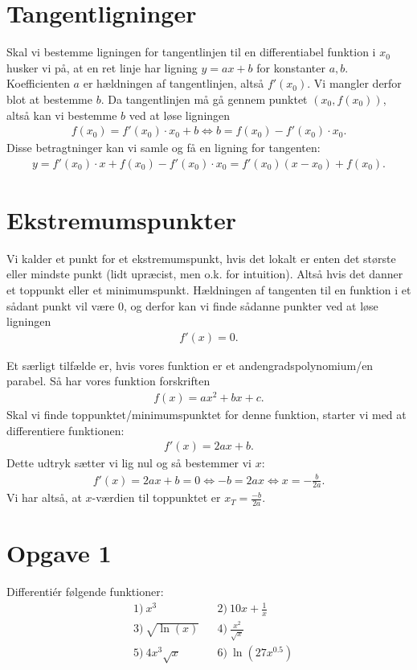 \section*{Tangentligninger}
Skal vi bestemme ligningen for tangentlinjen til en differentiabel funktion i $x_0$ husker vi på, at en ret linje har ligning $y=ax+b$ for konstanter $a,b$. Koefficienten $a$ er hældningen af tangentlinjen, altså $f'(x_0)$. Vi mangler derfor blot at bestemme $b$. Da tangentlinjen må gå gennem punktet $(x_0,f(x_0))$, altså kan vi bestemme $b$ ved at løse ligningen 
\begin{align*}
f(x_0) = f'(x_0)\cdot x_0 + b \Leftrightarrow b = f(x_0)-f'(x_0)\cdot x_0.
\end{align*}
Disse betragtninger kan vi samle og få en ligning for tangenten:
\begin{align*}
y = f'(x_0)\cdot x + f(x_0)-f'(x_0)\cdot x_0 = f'(x_0)(x-x_0) + f(x_0).
\end{align*}
\section*{Ekstremumspunkter}
Vi kalder et punkt for et ekstremumspunkt, hvis det lokalt er enten det største eller mindste punkt (lidt upræcist, men o.k. for intuition). Altså hvis det danner et toppunkt eller et minimumspunkt. Hældningen af tangenten til en funktion i et sådant punkt vil være $0$, og derfor kan vi finde sådanne punkter ved at løse ligningen 
\begin{align*}
f'(x)=0.
\end{align*}

Et særligt tilfælde er, hvis vores funktion er et andengradspolynomium/en parabel. Så har vores funktion forskriften
\begin{align*}
f(x) = ax^2+bx+c. 
\end{align*}
Skal vi finde toppunktet/minimumspunktet for denne funktion, starter vi med at differentiere funktionen:
\begin{align*}
f'(x) = 2ax +b.
\end{align*}
Dette udtryk sætter vi lig nul og så bestemmer vi $x$:
\begin{align*}
f'(x) = 2ax+b = 0 \Leftrightarrow -b = 2ax \Leftrightarrow x=-\frac{b}{2a}.
\end{align*}
Vi har altså, at $x$-værdien til toppunktet er $x_T = \frac{-b}{2a}.$
\section*{Opgave 1}
Differentiér følgende funktioner:
\begin{align*}
&1) \ x^3  &&2) \  10x+\frac{1}{x}   \\
&3) \ \sqrt{\ln(x)}  &&4) \  \frac{x^2}{\sqrt{x}}    \\
&5) \ 4x^3\sqrt{x}  &&6) \ \ln(27x^{0.5})    
\end{align*}
